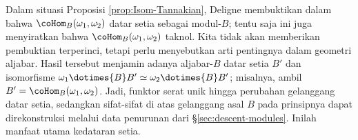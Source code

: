 Dalam situasi Proposisi \ref{prop:Isom-Tannakian}, Deligne membuktikan dalam
\cite[1.11--1.13]{Del90} bahwa $\coHom_B(\omega_1,\omega_2)$ datar setia sebagai
modul-$B$; tentu saja ini juga menyiratkan bahwa
$\coHom_B(\omega_1,\omega_2)$ taknol. Kita tidak akan memberikan pembuktian
terperinci, tetapi perlu menyebutkan arti pentingnya dalam geometri aljabar.
Hasil tersebut menjamin adanya aljabar-$B$ datar setia $B'$ dan isomorfisme
$\omega_1\dotimes{B}B'\simeq\omega_2\dotimes{B}B'$; misalnya, ambil
$B'=\coHom_B(\omega_1,\omega_2)$. Jadi, funktor serat unik hingga perubahan
gelanggang datar setia, sedangkan sifat-sifat di atas gelanggang asal $B$ pada
prinsipnya dapat direkonstruksi melalui data penurunan dari
\S\ref{sec:descent-modules}. Inilah manfaat utama kedataran setia.
